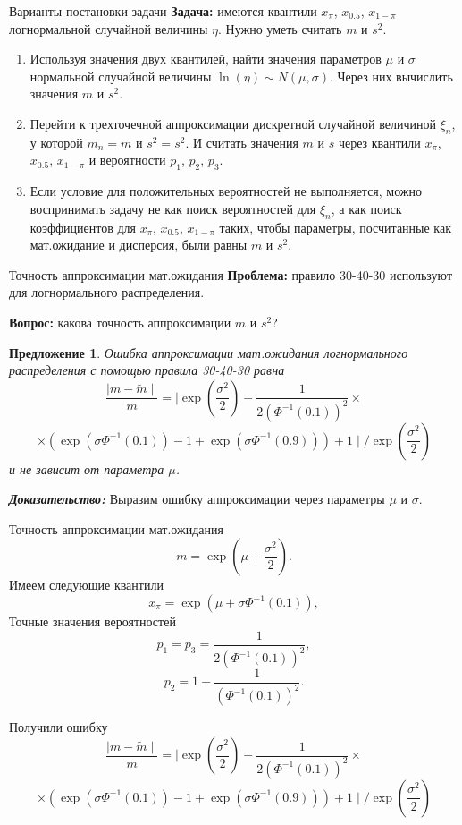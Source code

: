 \documentclass[ucs, notheorems, handout]{beamer}
\newtheorem{proposition}[theorem]{Предложение}
\begin{document}
\begin{frame}{Варианты постановки задачи}
	\textbf{Задача:} имеются квантили $x_{\pi}$, $x_{0.5}$, $x_{1-\pi}$ логнормальной случайной величины $\eta$. Нужно уметь считать $m$ и $s^{2}$.
	
	\begin{enumerate}
		\item Используя значения двух квантилей, найти значения параметров $\mu$ и $\sigma$ нормальной случайной величины $\ln(\eta)\sim N(\mu, \sigma)$. Через них вычислить значения $m$ и $s^{2}$.
		\item Перейти к трехточечной аппроксимации дискретной случайной величиной $\xi_{n}$, у которой $m_{n} = m$ и $s^{2}=s^{2}$. И считать значения $m$ и $s$ через квантили $x_{\pi}$, $x_{0.5}$, $x_{1-\pi}$ и вероятности $p_{1}$, $p_{2}$, $p_{3}$.
		\item Если условие для положительных вероятностей не выполняется, можно воспринимать задачу не как поиск вероятностей для $\xi_{n}$, а как поиск коэффициентов для $x_{\pi}$, $x_{0.5}$, $x_{1-\pi}$ таких, чтобы параметры, посчитанные как мат.ожидание и дисперсия, были равны $m$ и $s^{2}$. 
	\end{enumerate}
\end{frame}

\begin{frame}{Точность аппроксимации мат.ожидания}
	\textbf{Проблема:} правило 30-40-30 используют для логнормального распределения.
	
	\textbf{Вопрос:} какова точность аппроксимации $m$ и $s^{2}$?
	
	\begin{proposition}\label{pr5}
		Ошибка аппроксимации мат.ожидания логнормального распределения с помощью правила 30-40-30 равна
		\[\dfrac{\mid m - \widetilde{m} \mid}{m} = \mid \exp(\dfrac{\sigma^{2}}{2}) - \dfrac{1}{2(\Phi^{-1}(0.1))^{2}}\times\]\[\times(\exp(\sigma\Phi^{-1}(0.1))-1 +\exp(\sigma\Phi^{-1}(0.9))) + 1 \mid/\exp\left(\dfrac{\sigma^{2}}{2}\right)\]
		и не зависит от параметра $\mu$.
	\end{proposition}
	\textit{\textbf{Доказательство:}}
		Выразим ошибку аппроксимации через параметры $\mu$ и $\sigma$.
\end{frame}

\begin{frame}{Точность аппроксимации мат.ожидания}
	\[m = \exp\left(\mu+\dfrac{\sigma^{2}}{2}\right).\]
	Имеем следующие квантили
	\[x_{\pi} = \exp(\mu+\sigma\Phi^{-1}(0.1)),\]
	Точные значения вероятностей
	\[p_{1} = p_{3} = \dfrac{1}{2(\Phi^{-1}(0.1))^{2}},\]
	\[p_{2} = 1 - \dfrac{1}{(\Phi^{-1}(0.1))^{2}}.\]
	
	Получили ошибку
	\[\dfrac{\mid m - \widetilde{m} \mid}{m} = \mid \exp(\dfrac{\sigma^{2}}{2}) - \dfrac{1}{2(\Phi^{-1}(0.1))^{2}}\times\]\[\times(\exp(\sigma\Phi^{-1}(0.1))-1 +\exp(\sigma\Phi^{-1}(0.9))) + 1 \mid/\exp\left(\dfrac{\sigma^{2}}{2}\right)\]
\end{frame}
\end{document}
